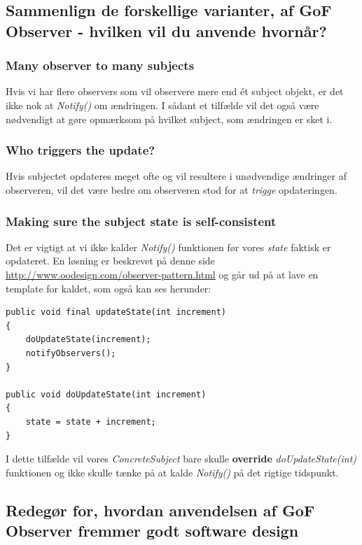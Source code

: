 \subsection{Sammenlign de forskellige varianter, af GoF Observer - hvilken vil du anvende hvornår?}

\subsubsection{Many observer to many subjects}
Hvis vi har flere observers som vil observere mere end ét subject objekt, er det ikke nok at \textit{Notify()} om ændringen. I sådant et tilfælde vil det også være nødvendigt at gøre opmærksom på hvilket subject, som ændringen er sket i.

\subsubsection{Who triggers the update?}
Hvis subjectet opdateres meget ofte og vil resultere i unødvendige ændringer af observeren, vil det være bedre om observeren stod for at \textit{trigge} opdateringen.

\subsubsection{Making sure the subject state is self-consistent}
Det er vigtigt at vi ikke kalder \textit{Notify()} funktionen før vores \textit{state} faktisk er opdateret. En løsning er beskrevet på denne side \url{http://www.oodesign.com/observer-pattern.html} og går ud på at lave en template for kaldet, som også kan ses herunder:

\begin{lstlisting}
public void final updateState(int increment)
{
	doUpdateState(increment);
	notifyObservers();
}

public void doUpdateState(int increment)
{
	state = state + increment;		
}
\end{lstlisting}

I dette tilfælde vil vores \textit{ConcreteSubject} bare skulle \textbf{override} \textit{doUpdateState(int)} funktionen og ikke skulle tænke på at kalde \textit{Notify()} på det rigtige tidspunkt.

\subsection{Redegør for, hvordan anvendelsen af GoF Observer fremmer godt software design}

